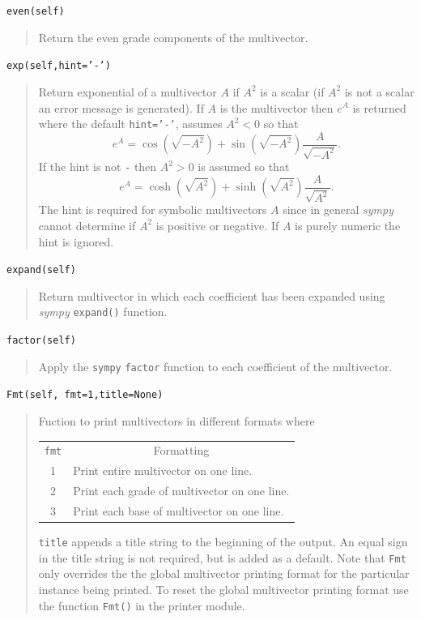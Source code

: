 \documentclass[12pt]{report}
\newcommand{\bfrac}[2]{\displaystyle\frac{#1}{#2}}
\newcommand{\lp}{\left (}
\newcommand{\rp}{\right )}
\newcommand{\f}[2]{{#1}\lp {#2} \rp}
\newcommand{\T}[1]{\texttt{#1}}
\begin{document}
\T{even(self)}
\begin{quote}
   Return the even grade components of the multivector.
\end{quote}

\T{exp(self,hint='-')}
\begin{quote}
    Return exponential of a multivector $A$ if $A^{2}$ is a scalar (if $A^{2}$ is not a scalar an
    error message is generated).  If $A$ is the multivector then $e^{A}$ is returned
    where the default \T{hint='-'}, assumes $A^{2} < 0$ so that
    \begin{equation*}
            e^{A} = \f{\cos}{\sqrt{-A^{2}}}+\f{\sin}{\sqrt{-A^{2}}}\bfrac{A}{\sqrt{-A^{2}}}.
    \end{equation*}
    If the hint is not \T{-} then $A^{2} > 0$ is assumed so that
    \begin{equation*}
            e^{A} = \f{\cosh}{\sqrt{A^{2}}}+\f{\sinh}{\sqrt{A^{2}}}\bfrac{A}{\sqrt{A^{2}}}.
    \end{equation*}
    The hint is required for symbolic multivectors $A$ since in general \emph{sympy} cannot determine if
    $A^{2}$ is positive or negative.  If $A$ is purely numeric the hint is ignored.
\end{quote}

\T{expand(self)}
\begin{quote}
   Return multivector in which each coefficient has been expanded using
   \emph{sympy} \T{expand()} function.
\end{quote}

\T{factor(self)}
\begin{quote}
   Apply the \T{sympy} \T{factor} function to each coefficient of the multivector.
\end{quote}

\T{Fmt(self, fmt=1,title=None)}
\begin{quote}
    Fuction to print multivectors in different formats where
    \begin{center}
    \begin{tabular}{cl}
    \T{fmt} & \multicolumn{1}{c}{Formatting} \\
    1 & Print entire multivector on one line. \\
    2 & Print each grade of multivector on one line.\\
    3 & Print each base of multivector on one line.
    \end{tabular}
    \end{center}
    \T{title} appends a title string to the beginning of the output.  An equal sign in
    the title string is not required, but is added as a default.
    Note that \T{Fmt} only overrides the the global multivector printing format for the
    particular instance being printed.  To reset the global multivector printing format
    use the function \T{Fmt()} in the printer module.
\end{quote}
\end{document}
